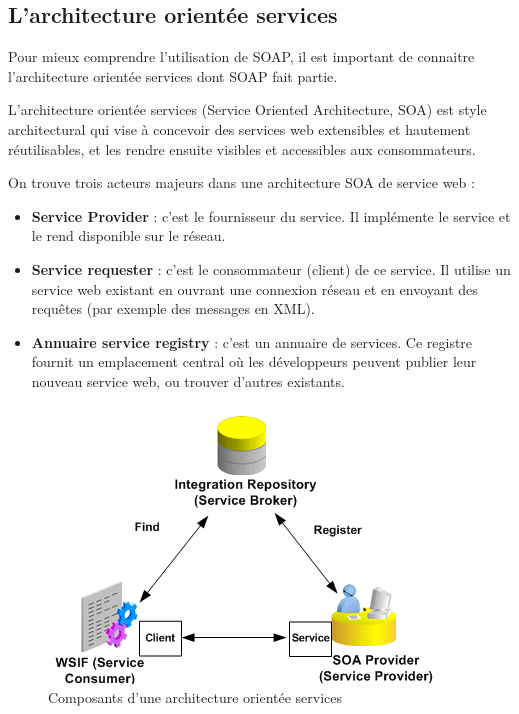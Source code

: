 \subsection{L'architecture orientée services}
Pour mieux comprendre l'utilisation de SOAP, il est important de connaitre l'architecture orientée services dont SOAP fait partie.

L'architecture orientée services (Service Oriented Architecture, SOA) est style architectural qui vise à concevoir des services web extensibles et hautement réutilisables, et les rendre ensuite visibles et accessibles aux consommateurs.
				
On trouve trois acteurs majeurs dans une architecture SOA de service web :
\begin{itemize}
	\item \textbf{Service Provider} : 
	      c'est le fournisseur du service. Il implémente le service et le rend disponible sur le réseau.
	\item \textbf{Service requester} :
	      c'est le consommateur (client) de ce service. Il utilise un service web existant en ouvrant une connexion réseau et en envoyant des requêtes (par exemple des messages en XML).
	\item \textbf{Annuaire service registry} : 
	      c'est un annuaire de services. Ce registre fournit un emplacement central où les développeurs peuvent publier leur nouveau service web, ou trouver d'autres existants.\newline 
\end{itemize}

\begin{figure}[h]
	\center
	\includegraphics[scale=0.71]{img/SOA.png}
	\caption{Composants d'une architecture orientée services}		
	\centering
\end{figure}		

